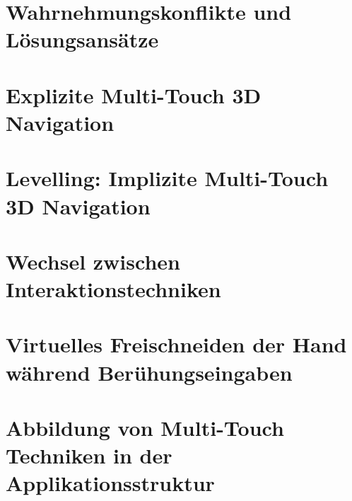 \documentclass[pdftex,12pt,a4paper]{report}
\begin{document}

\chapter{Wahrnehmungskonflikte und Lösungsansätze}
\label{chp:wahrnehmungskonflikte_und_loesungsansaetze}



\chapter{Explizite Multi-Touch 3D Navigation}
\label{chp:explizite_interaktion}



\chapter{Levelling: Implizite Multi-Touch 3D Navigation}
\label{chp:implizite_navigation}



\chapter{Wechsel zwischen Interaktionstechniken}
\label{chp:wechsel_zwischen_interaktionstechniken}



\chapter{Virtuelles Freischneiden der Hand während Berühungseingaben}
\label{chp:freischneiden}



\chapter{Abbildung von Multi-Touch Techniken in der Applikationsstruktur}
\label{chp:applikationsstruktur}

\end{document}
